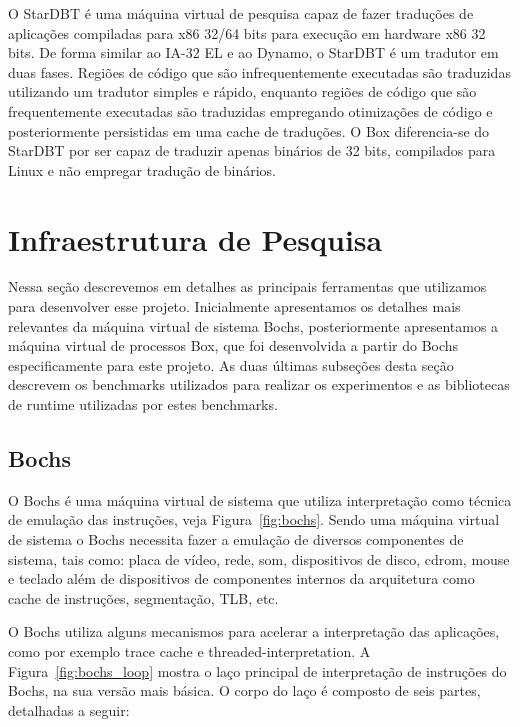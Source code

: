 \documentclass[11pt,twoside]{article}
\begin{document}
O StarDBT \cite{Wang2007} é uma máquina virtual de pesquisa capaz de fazer traduções de 
aplicações compiladas para x86 32/64 bits para execução em hardware x86 32 bits. De 
forma similar ao IA-32 EL e ao Dynamo, o StarDBT é um tradutor em duas fases. Regiões 
de código que são infrequentemente executadas são traduzidas utilizando um tradutor 
simples e rápido, enquanto regiões de código que são frequentemente executadas são 
traduzidas empregando otimizações de código e posteriormente persistidas em uma cache 
de traduções. O Box diferencia-se do StarDBT por ser capaz de traduzir apenas binários 
de 32 bits, compilados para Linux e não empregar tradução de binários.





\section{Infraestrutura de Pesquisa} \label{sec:infraestrutura}

Nessa seção descrevemos em detalhes as principais ferramentas que
utilizamos para desenvolver esse projeto. Inicialmente apresentamos
os detalhes mais relevantes da máquina virtual de sistema Bochs, 
posteriormente apresentamos a máquina virtual de processos Box, que
foi desenvolvida a partir do Bochs especificamente para este projeto.
As duas últimas subseções desta seção descrevem os benchmarks 
utilizados para realizar os experimentos e as bibliotecas de runtime
utilizadas por estes benchmarks.

\subsection{Bochs}

O Bochs é uma máquina virtual de sistema que utiliza interpretação como
técnica de emulação das instruções, veja Figura~\ref{fig:bochs}. Sendo 
uma máquina virtual de sistema o Bochs necessita fazer a emulação de 
diversos componentes de sistema, tais como: placa de vídeo, rede, som,
dispositivos de disco, cdrom, mouse e teclado além de dispositivos de
componentes internos da arquitetura como cache de instruções, segmentação,
TLB, etc.

O Bochs utiliza alguns mecanismos para acelerar a interpretação das 
aplicações, como por exemplo trace cache e threaded-interpretation.
A Figura~\ref{fig:bochs_loop} mostra o laço principal de interpretação 
de instruções do Bochs, na sua versão mais básica. O corpo do laço
é composto de seis partes, detalhadas a seguir:
\end{document}
